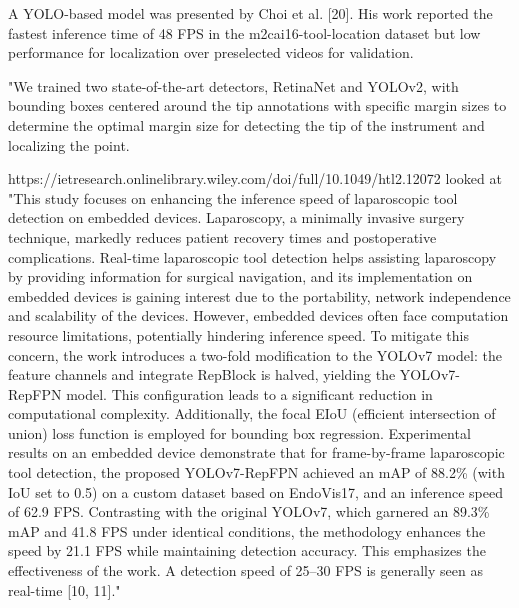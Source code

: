 A YOLO-based model was presented by Choi et al. [20]. His work reported the fastest inference time of 48 FPS in the m2cai16-tool-location dataset but low performance for localization over preselected videos for validation. 

"We trained two state-of-the-art detectors, RetinaNet and YOLOv2, with bounding boxes centered around the tip annotations with specific margin sizes to determine the optimal margin size for detecting the tip of the instrument and localizing the point. 

https://ietresearch.onlinelibrary.wiley.com/doi/full/10.1049/htl2.12072 looked at "This study focuses on enhancing the inference speed of laparoscopic tool detection on embedded devices. Laparoscopy, a minimally invasive surgery technique, markedly reduces patient recovery times and postoperative complications. Real-time laparoscopic tool detection helps assisting laparoscopy by providing information for surgical navigation, and its implementation on embedded devices is gaining interest due to the portability, network independence and scalability of the devices. However, embedded devices often face computation resource limitations, potentially hindering inference speed. To mitigate this concern, the work introduces a two-fold modification to the YOLOv7 model: the feature channels and integrate RepBlock is halved, yielding the YOLOv7-RepFPN model. This configuration leads to a significant reduction in computational complexity. Additionally, the focal EIoU (efficient intersection of union) loss function is employed for bounding box regression. Experimental results on an embedded device demonstrate that for frame-by-frame laparoscopic tool detection, the proposed YOLOv7-RepFPN achieved an mAP of 88.2\% (with IoU set to 0.5) on a custom dataset based on EndoVis17, and an inference speed of 62.9 FPS. Contrasting with the original YOLOv7, which garnered an 89.3\% mAP and 41.8 FPS under identical conditions, the methodology enhances the speed by 21.1 FPS while maintaining detection accuracy. This emphasizes the effectiveness of the work. A detection speed of 25–30 FPS is generally seen as real-time [10, 11]."

